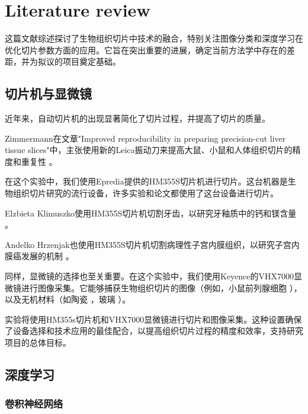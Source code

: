 \section{Literature review}


这篇文献综述探讨了生物组织切片中技术的融合，特别关注图像分类和深度学习在优化切片参数方面的应用。它旨在突出重要的进展，确定当前方法学中存在的差距，并为拟议的项目奠定基础。

\subsection{切片机与显微镜}

近年来，自动切片机的出现显著简化了切片过程，并提高了切片的质量。

Zimmermann在文章"Improved reproducibility in preparing precision-cut liver tissue slices"中，主张使用新的Leica振动刀来提高大鼠、小鼠和人体组织切片的精度和重复性 \cite{LR.1}。

在这个实验中，我们使用Epredia提供的HM355S切片机进行切片。这台机器是生物组织切片研究的流行设备，许多实验和论文都使用了这台设备进行切片。

Elzbieta Klimuszko使用HM355S切片机切割牙齿，以研究牙釉质中的钙和镁含量 \cite{LR.2}。

Andelko Hrzenjak也使用HM355S切片机切割病理性子宫内膜组织，以研究子宫内膜癌发展的机制 \cite{LR.3}。

同样，显微镜的选择也至关重要。在这个实验中，我们使用Keyence的VHX7000显微镜进行图像采集。它能够捕获生物组织切片的图像（例如，小鼠前列腺细胞 \cite{LR.4}），以及无机材料（如陶瓷 \cite{LR.5}，玻璃 \cite{LR.6}）。

实验将使用HM355s切片机和VHX7000显微镜进行切片和图像采集。这种设置确保了设备选择和技术应用的最佳配合，以提高组织切片过程的精度和效率，支持研究项目的总体目标。








\subsection{深度学习}

\subsubsection{卷积神经网络}

